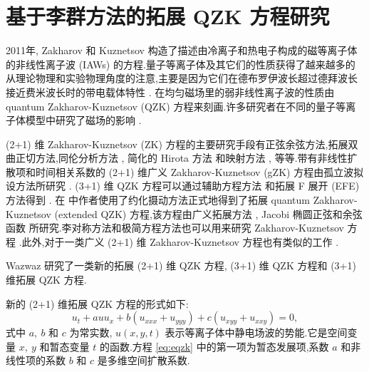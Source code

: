 \chapter{基于李群方法的拓展 QZK 方程研究}

2011年, Zakharov 和 Kuznetsov \cite{abdou2011quant} 构造了描述由冷离子和热电子构成的磁等离子体的非线性离子波 (IAWs) 的方程.量子等离子体及其它们的性质获得了越来越多的从理论物理和实验物理角度的注意,主要是因为它们在德布罗伊波长超过德拜波长接近费米波长时的带电载体特性 \cite{abdou2011quant,ahmed2013kinks,bhrawy2013soli,biswas20091soli,biswas2013soli,bluman2010appli,elganaini2011tra,godleswski2004the,guner2015bright,ibragimov2006inte}. 在均匀磁场里的弱非线性离子波的性质由 quantum Zakharov-Kuznetsov (QZK) 方程来刻画.许多研究者在不同的量子等离子体模型中研究了磁场的影响 \cite{ibragimov2007anew,iwasaki1990cylin,johnpilai2011sym,khan2008linear,krishnan2010sol,leveque1992num,linares2009well,linares2011local,morris2013soli,moslem2007soli,mothibi2015con,moussa2001simi,munro2014con,munro2000sta,mushtaq2005non,olver2000app,peng2008exact,sabry2009non}.

(2+1) 维 Zakharov-Kuznetsov (ZK) 方程的主要研究手段有正弦余弦方法,拓展双曲正切方法,同伦分析方法 \cite{linares2009well}, 简化的 Hirota 方法 \cite{biswas2013soli,bluman2010appli} 和映射方法 \cite{morris2013soli}, 等等.带有非线性扩散项和时间相关系数的 (2+1) 维广义 Zakharov-Kuznetsov (gZK) 方程由孤立波拟设方法所研究 \cite{sabry2009non}. (3+1) 维 QZK 方程可以通过辅助方程方法 \cite{ahmed2013kinks} 和拓展 F 展开 (EFE) 方法得到 \cite{munro2000sta}. 在 \cite{ahmed2013kinks} 中作者使用了约化摄动方法正式地得到了拓展 quantum Zakharov-Kuznetsov (extended QZK) 方程,该方程由广义拓展方法 \cite{guner2015bright}, Jacobi 椭圆正弦和余弦函数 \cite{biswas20091soli} 所研究.李对称方法和极简方程方法也可以用来研究 Zakharov-Kuznetsov 方程 \cite{leveque1992num}.此外,对于一类广义 (2+1) 维 Zakharov-Kuznetsov 方程也有类似的工作 \cite{moslem2007soli}.

Wazwaz \cite{elganaini2011tra} 研究了一类新的拓展 (2+1) 维 QZK 方程, (3+1) 维 QZK 方程和 (3+1) 维拓展 QZK 方程.

新的 (2+1) 维拓展 QZK 方程的形式如下:
\begin{equation}\label{eq:eqzk}
u_{t}+auu_{x}+b(u_{xxx}+u_{yyy})+c(u_{xyy}+u_{xxy})=0,
\end{equation}
式中 $a,~b$ 和 $c$ 为常实数, $u(x, y, t)$ 表示等离子体中静电场波的势能.它是空间变量 $x,~y$ 和暂态变量 $t$ 的函数.方程 \eqref{eq:eqzk} 中的第一项为暂态发展项,系数 $a$ 和非线性项的系数 $b$ 和 $c$ 是多维空间扩散系数.

